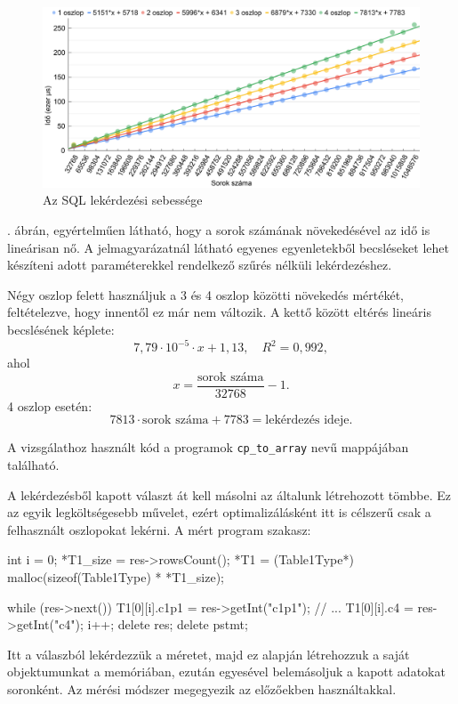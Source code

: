 \begin{figure}[h!]
\centering
\includegraphics[width=\textwidth]{images/graph/sqlquery.png}
\caption{Az SQL lekérdezési sebessége}
\label{fig:sqlquery}
\end{figure}

. ábrán, egyértelműen látható, hogy a sorok számának növekedésével az idő is lineárisan nő.
A jelmagyarázatnál látható egyenes egyenletekből becsléseket lehet készíteni adott paraméterekkel rendelkező szűrés nélküli lekérdezéshez. 

Négy oszlop felett használjuk a 3 és 4 oszlop közötti növekedés mértékét, feltételezve, hogy innentől ez már nem változik. A kettő között eltérés lineáris becslésének képlete: 
$$7,79 \cdot 10^{-5} \cdot x + 1,13, \quad R^2=0,992,$$ 
ahol
$$x = \dfrac{\text{sorok száma}}{32768} - 1.$$
4 oszlop esetén:
$$ 7813 \cdot \text{sorok száma} + 7783 = \text{lekérdezés ideje}.$$


A vizsgálathoz használt kód a programok \texttt{cp\_to\_array} nevű mappájában található.

A lekérdezésből kapott választ át kell másolni az általunk létrehozott tömbbe. Ez az egyik legköltségesebb művelet, ezért optimalizálásként itt is célszerű csak a felhasznált oszlopokat lekérni.
A mért program szakasz:
\begin{python}
int i = 0;
*T1_size = res->rowsCount();
*T1 = (Table1Type*) malloc(sizeof(Table1Type) * *T1_size);

while (res->next())
{
    T1[0][i].c1p1 = res->getInt("c1p1");
    // ...
    T1[0][i].c4 = res->getInt("c4");
    i++;
}
delete res;
delete pstmt;
\end{python}
Itt a válaszból lekérdezzük a méretet, majd ez alapján létrehozzuk a saját objektumunkat a memóriában, ezután egyesével belemásoljuk a kapott adatokat soronként.
Az mérési módszer megegyezik az előzőekben használtakkal.

